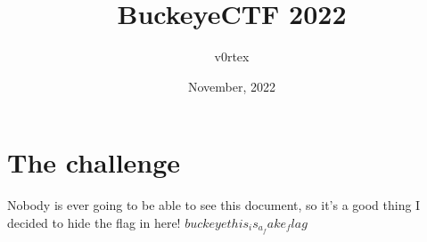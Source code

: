 \documentclass{article}
\title{BuckeyeCTF 2022}
\author{v0rtex}
\date{November, 2022}
\begin{document}
\maketitle

\section{The challenge}
Nobody is ever going to be able to see this document, so it's a good thing I decided to hide the flag in here! $buckeye{this_is_a_fake_flag}$
\end{document}
